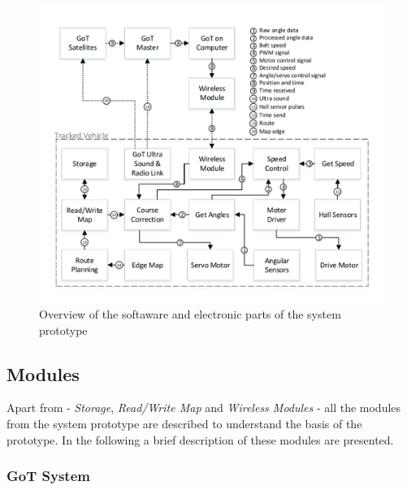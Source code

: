\begin{figure}[H]
	\centering
	\includegraphics[scale=.9]{figures/systemOverview2}
	\caption{Overview of the softaware and electronic parts of the system prototype}
	\label{fig:systemOverview2}
\end{figure}

\subsection{Modules}
Apart from - \textit{Storage}, \textit{Read/Write Map} and \textit{Wireless Modules} - all the modules from the system prototype are described to understand the basis of the prototype. In the following a brief description of these modules are presented.


\subsubsection{GoT System}

